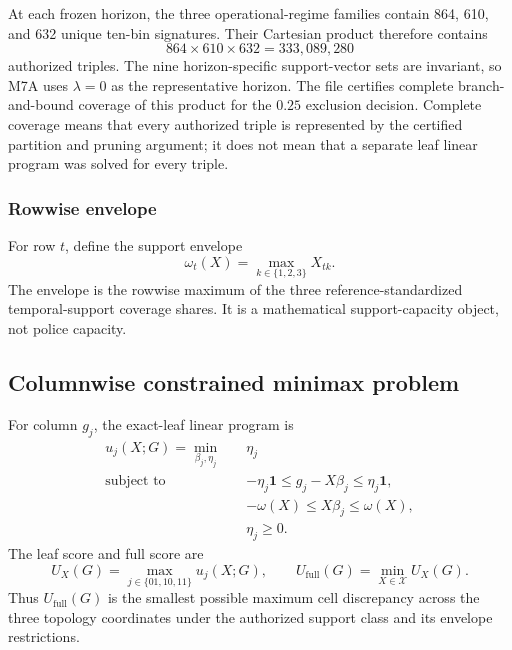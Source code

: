 \documentclass[11pt]{article}
\begin{document}
At each frozen horizon, the three operational-regime families contain 864, 610, and 632 unique ten-bin signatures. Their Cartesian product therefore contains
\begin{equation}
864\times610\times632=333{,}089{,}280
\end{equation}
authorized triples. The nine horizon-specific support-vector sets are invariant, so M7A uses $\lambda=0$ as the representative horizon. The file  certifies complete branch-and-bound coverage of this product for the $0.25$ exclusion decision. Complete coverage means that every authorized triple is represented by the certified partition and pruning argument; it does not mean that a separate leaf linear program was solved for every triple.

\subsubsection{Rowwise envelope}

For row $t$, define the support envelope
\begin{equation}
\omega_t(X)=\max_{k\in\{1,2,3\}}X_{tk}.
\label{eq:envelope}
\end{equation}
The envelope is the rowwise maximum of the three reference-standardized temporal-support coverage shares. It is a mathematical support-capacity object, not police capacity.

\subsection{Columnwise constrained minimax problem}

For column $g_j$, the exact-leaf linear program is
\begin{equation}
\begin{aligned}
u_j(X;G)=\min_{\beta_j,\eta_j}\quad &\eta_j\\
\text{subject to}\quad
&-\eta_j\mathbf 1\le g_j-X\beta_j\le \eta_j\mathbf 1,\\
&-\omega(X)\le X\beta_j\le \omega(X),\\
&\eta_j\ge0.
\end{aligned}
\label{eq:lp}
\end{equation}
The leaf score and full score are
\begin{equation}
U_X(G)=\max_{j\in\{01,10,11\}}u_j(X;G),
\qquad
U_{\mathrm{full}}(G)=\min_{X\in\mathcal X}U_X(G).
\label{eq:fullscore}
\end{equation}
Thus $U_{\mathrm{full}}(G)$ is the smallest possible maximum cell discrepancy across the three topology coordinates under the authorized support class and its envelope restrictions.
\end{document}
